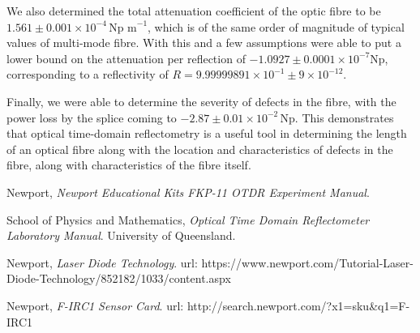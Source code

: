 We also determined the total attenuation coefficient of the optic fibre to be $1.561 \pm 0.001 \times 10^{-4}\, \text{Np m}^{-1}$, which is of the same order of magnitude of typical values of multi-mode fibre. With this and a few assumptions were able to put a lower bound on the attenuation per reflection of
$-1.0927 \pm 0.0001 \times 10^{-7} \text{Np}$, corresponding to a reflectivity of
$R = 9.99999891 \times 10^{-1} \pm 9 \times 10^{-12}$.

Finally, we were able to determine the severity of defects in the fibre, with the power loss by the splice coming to $-2.87 \pm 0.01 \times 10^{-2}\,\text{Np}$. 
This demonstrates that optical time-domain reflectometry is a useful tool in determining the length of an optical fibre along with the location and characteristics of defects in the fibre, along with characteristics of the fibre itself.


\begin{thebibliography}{9}
	Newport,
	\emph{Newport Educational Kits FKP-11 OTDR Experiment Manual}.
	
	School of Physics and Mathematics,
	\emph{Optical Time Domain Reflectometer Laboratory Manual}.
	University of Queensland.
	
	Newport,
	\emph{Laser Diode Technology}.
	url: {https://www.newport.com/Tutorial-Laser-Diode-Technology/852182/1033/content.aspx}

	Newport,
	\emph{F-IRC1 Sensor Card}.
	url: {http://search.newport.com/?x1=sku\&q1=F-IRC1}
\end{thebibliography}

